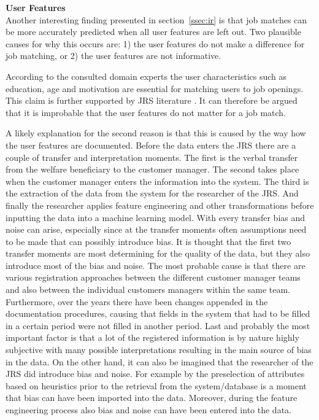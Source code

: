 \noindent
\textbf{User Features}\\
Another interesting finding presented in section~\ref{ssec:ir} is that job matches can be more accurately predicted when all user features are left out.  
Two plausible causes for why this occurs are: 1) the user features do not make a difference for job matching, or 2) the user features are not informative.

According to the consulted domain experts the user characteristics such as education, age and motivation are essential for matching users to job openings. 
This claim is further supported by JRS literature \cite{kenthapadi2017personalized, T.Al-Otaibi2012ASystems, Zheng2012JobSurvey, hong2013job}.
It can therefore be argued that it is improbable that the user features do not matter for a job match. 

A likely explanation for the second reason is that this is caused by the way how the user features are documented.
Before the data enters the JRS there are a couple of transfer and interpretation moments. 
The first is the verbal transfer from the welfare beneficiary to the customer manager.
The second takes place when the customer manager enters the information into the system.
The third is the extraction of the data from the system for the researcher of the JRS.
And finally the researcher applies feature engineering and other transformations before inputting the data into a machine learning model.
With every transfer bias and noise can arise, especially since at the transfer moments often assumptions need to be made that can possibly introduce bias.
It is thought that the first two transfer moments are most determining for the quality of the data, but they also introduce most of the bias and noise. The most probable cause is that there are various registration approaches between the different customer manager teams and also between the individual customers managers within the same team. 
Furthermore, over the years there have been changes appended in the documentation procedures, causing that fields in the system that had to be filled in a certain period were not filled  in another period.
Last and probably the most important factor is that a lot of the registered information is by nature highly subjective with many possible interpretations resulting in the main source of bias in the data. 
On the other hand, it can also be imagined that the researcher of the JRS did introduce bias and noise.
For example by the preselection of attributes based on heuristics prior to the retrieval from the system/database is a moment that bias can have been imported into the data.
Moreover, during the feature engineering process also bias and noise can have been entered into the data.

